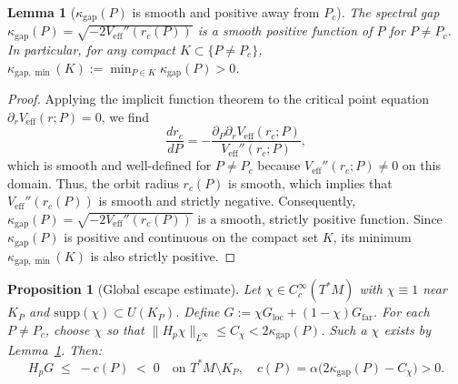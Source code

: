 \documentclass[12pt,a4paper]{amsart}
\newtheorem{lemma}[theorem]{Lemma}
\newtheorem{proposition}[theorem]{Proposition}
\theoremstyle{remark}
\begin{document}
\begin{lemma}[$\kappa_{\mathrm{gap}}(P)$ is smooth and positive away from $P_c$]
\label{lem:lambda_smooth}
The spectral gap $\kappa_{\mathrm{gap}}(P) = \sqrt{-2V_{\mathrm{eff}}''(r_c(P))}$
is a smooth positive function of $P$ for $P \neq P_c$.
In particular, for any compact $K \subset \{P \neq P_c\}$,
$\kappa_{\mathrm{gap},\min}(K) := \min_{P \in K}\kappa_{\mathrm{gap}}(P) > 0$.
\end{lemma}

\begin{proof}
Applying the implicit function theorem to the critical point equation $\partial_r V_{\mathrm{eff}}(r;P) = 0$,
we find
\[
\frac{dr_c}{dP} = -\frac{\partial_P\partial_r V_{\mathrm{eff}}(r_c;P)}{V_{\mathrm{eff}}''(r_c;P)},
\]
which is smooth and well-defined for $P \neq P_c$ because $V_{\mathrm{eff}}''(r_c;P) \neq 0$
on this domain. Thus, the orbit radius $r_c(P)$ is smooth, which implies that
$V_{\mathrm{eff}}''(r_c(P))$ is smooth and strictly negative. Consequently,
$\kappa_{\mathrm{gap}}(P) = \sqrt{-2V_{\mathrm{eff}}''(r_c(P))}$ is a smooth, strictly positive function.
Since $\kappa_{\mathrm{gap}}(P)$ is positive and continuous on the compact set $K$, its minimum
$\kappa_{\mathrm{gap},\min}(K)$ is also strictly positive.
\end{proof}

\begin{proposition}[Global escape estimate]
\label{prop:global_escape}
Let $\chi \in C_c^\infty(T^*M)$ with $\chi \equiv 1$ near $K_P$
and $\mathrm{supp}(\chi) \subset U(K_P)$.
Define $G := \chi G_{\mathrm{loc}} + (1-\chi)G_{\mathrm{far}}$.
For each $P \neq P_c$, choose $\chi$ so that $\|H_p\chi\|_{L^\infty} \leq C_\chi < 2\kappa_{\mathrm{gap}}(P)$.
Such a $\chi$ exists by Lemma~\ref{lem:lambda_smooth}. Then:
\[
H_p G \;\leq\; -c(P) \;<\; 0
\quad\text{on } T^*M \setminus K_P,
\quad
c(P) = \alpha\bigl(2\kappa_{\mathrm{gap}}(P) - C_\chi\bigr) > 0.
\]
\end{proposition}
\end{document}
